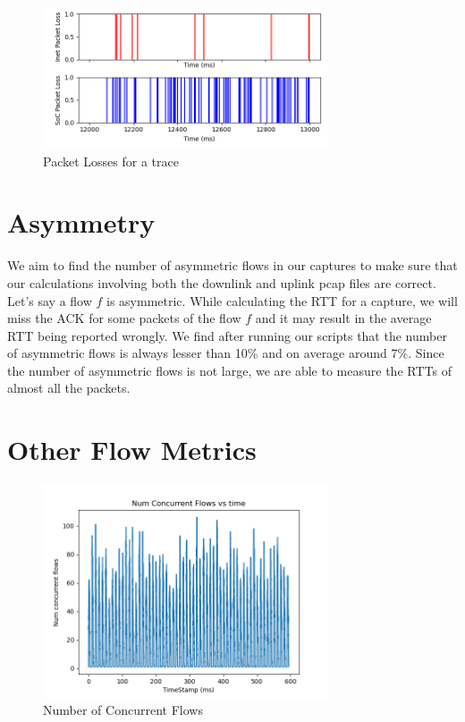 \begin{figure}[t]
    \centering
        \includegraphics[width=0.75\textwidth]{Figures/packetloss.png}
    \caption[Packet Losses for a trace]{Packet Losses for a trace}
    \label{fig:pktloss}
    \bigskip
\end{figure}

\section{Asymmetry}

We aim to find the number of asymmetric flows in our captures to make sure that our calculations involving both the downlink and uplink pcap files are correct. Let's say a flow $f$ is asymmetric. While calculating the RTT for a capture, we will miss the ACK for some packets of the flow $f$  and it may result in the average RTT being reported wrongly. We find after running our scripts that the number of asymmetric flows is always lesser than 10\% and on average around 7\%. 
Since the number of asymmetric flows is not large, we are able to measure the RTTs of almost all the packets.

\section{Other Flow Metrics}

\begin{figure}[t]
    \centering
        \includegraphics[width=0.75\textwidth]{Figures/concurrent_flows.png}
    \caption[Number of Concurrent Flows]{Number of Concurrent Flows}
    \label{fig:concurr}
    \bigskip
\end{figure}

